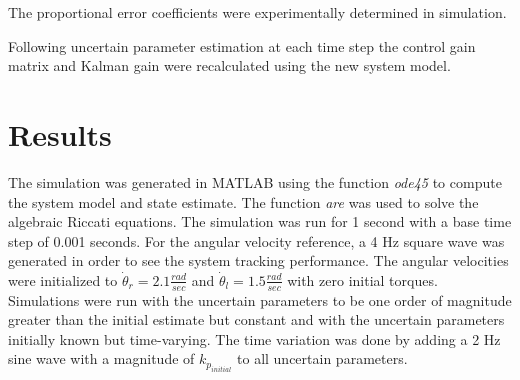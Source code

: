 \documentclass[letterpaper,12pt]{report}
\begin{document}
The proportional error coefficients were experimentally determined in simulation.

Following uncertain parameter estimation at each time step the control gain matrix and Kalman gain were recalculated using the new system model.

\chapter{Results}

The simulation was generated in MATLAB using the function {\it ode45} to compute the system model and state estimate. The function {\it are} was used to solve the algebraic Riccati equations.
The simulation was run for 1 second with a base time step of 0.001 seconds. For the angular velocity reference, a 4 Hz square wave was generated in order to see the system tracking performance.
The angular velocities were initialized to $\dot\theta_r = 2.1 \frac{rad}{sec}$ and $\dot\theta_l = 1.5 \frac{rad}{sec}$ with zero initial torques. Simulations were run with the uncertain parameters
to be one order of magnitude greater than the initial estimate but constant and with the uncertain parameters initially known but time-varying. The time variation was done by adding a 2 Hz sine wave
with a magnitude of $k_{p_{initial}}$ to all uncertain parameters.
\end{document}
